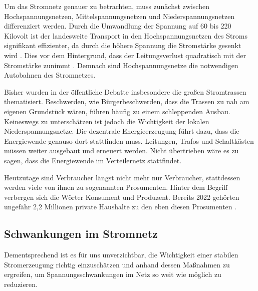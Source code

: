 \documentclass[12pt, a4paper]{article}
\begin{document}

Um das Stromnetz genauer zu betrachten, muss zunächst zwischen Hochspannungsnetzen, Mittelspannungsnetzen und Niederspannungsnetzen differenziert werden. Durch die Umwandlung der Spannung auf 60 bis 220 Kilovolt ist der landesweite Transport in den Hochspannungsnetzen des Stroms signifikant effizienter, da durch die höhere Spannung die Stromstärke gesenkt wird \cite{faz2023stromnetz}. Dies vor dem Hintergrund, dass der Leitungsverlust quadratisch mit der Stromstärke zunimmt \cite{ws:leifiphysik}. Demnach sind Hochspannungsnetze die notwendigen Autobahnen des Stromnetzes.

Bisher wurden in der öffentliche Debatte insbesondere die großen Stromtrassen thematisiert. Beschwerden, wie Bürgerbeschwerden, dass die Trassen zu nah am eigenen Grundstück wären, führen häufig zu einem schleppenden Ausbau. Keineswegs zu unterschätzen ist jedoch die Wichtigkeit der lokalen Niederspannungsnetze. Die dezentrale Energieerzeugung führt dazu, dass die Energiewende genauso dort stattfinden muss. Leitungen, Trafos und Schaltkästen müssen weiter ausgebaut und erneuert werden. Nicht übertrieben wäre es zu sagen, dass die Energiewende im Verteilernetz stattfindet.

Heutzutage sind Verbraucher längst nicht mehr nur Verbraucher, stattdessen werden viele von ihnen zu sogenannten Prosumenten. Hinter dem Begriff verbergen sich die Wörter Konsument und Produzent. Bereits 2022 gehörten ungefähr 2,2 Millionen private Haushalte zu den eben diesen Prosumenten \cite{ws:destatis}. 




\subsection{Schwankungen im Stromnetz}

Dementsprechend ist es für uns unverzichtbar, die Wichtigkeit einer stabilen \linebreak Stromerzeugung richtig einzuschätzen und anhand dessen Maßnahmen zu ergreifen, um Spannungsschwankungen im Netz so weit wie möglich zu reduzieren.
\end{document}
